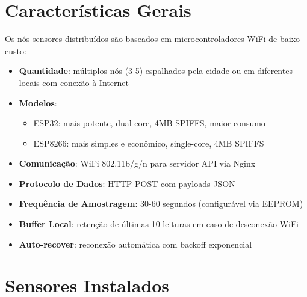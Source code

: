 \documentclass[12pt,a4paper,oneside]{report}
\begin{document}
\section{Características Gerais}

Os nós sensores distribuídos são baseados em microcontroladores WiFi de baixo custo:

\begin{itemize}[leftmargin=1.2cm]
    \item \textbf{Quantidade}: múltiplos nós (3-5) espalhados pela cidade ou em diferentes locais com conexão à Internet
    \item \textbf{Modelos}: 
    \begin{itemize}
        \item ESP32: mais potente, dual-core, 4MB SPIFFS, maior consumo
        \item ESP8266: mais simples e econômico, single-core, 4MB SPIFFS
    \end{itemize}
    \item \textbf{Comunicação}: WiFi 802.11b/g/n para servidor API via Nginx
    \item \textbf{Protocolo de Dados}: HTTP POST com payloads JSON
    \item \textbf{Frequência de Amostragem}: 30-60 segundos (configurável via EEPROM)
    \item \textbf{Buffer Local}: retenção de últimas 10 leituras em caso de desconexão WiFi
    \item \textbf{Auto-recover}: reconexão automática com backoff exponencial
\end{itemize}

\section{Sensores Instalados}
\end{document}
